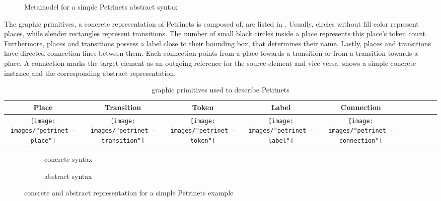 \begin{figure}[H]
  \centering
  
  \caption{Metamodel for a simple Petrinets abstract syntax}
  \label{fig:petrinets_metamodel}
\end{figure}

The graphic primitives, a concrete representation of Petrinets is composed of, are listed in . Usually, circles without fill color represent places, while slender rectangles represent transitions. The number of small black circles inside a place represents this place's token count. Furthermore, places and transitions possess a label close to their bounding box, that determines their name. Lastly, places and transitions have directed connection lines between them. Each connection points from a place towards a transition or from a transition towards a place. A connection marks the target element as an outgoing reference for the source element and vice versa.  shows a simple concrete instance and the corresponding abstract representation.



\begin{table}[ht]
  \centering
\begin{tabular}[width=.1\linewidth]{| Sc | Sc | Sc | Sc | Sc |}
  \hline
  Place & Transition & Token & Label & Connection 
  \\
  \hline
  \texttt{[image: images/"petrinet - place"]} 
  & 
  \texttt{[image: images/"petrinet - transition"]} 
  & 
  \texttt{[image: images/"petrinet - token"]}
  & 
  \texttt{[image: images/"petrinet - label"]}
  & 
  \texttt{[image: images/"petrinet - connection"]} 
  \\
  \hline
\end{tabular}
\caption{graphic primitives used to describe Petrinets}
\label{tab:petri-primitives}
\end{table}

\begin{figure}[ht!]
  \centering
  \begin{subfigure}[t]{.35\textwidth}
    \centering
    
    \caption{concrete syntax}
    \label{subfig:petriconcrete}    
  \end{subfigure}
  \begin{subfigure}[t]{.4\textwidth}
    \centering
    
    \caption{abstract syntax}
    \label{subfig:petriabstract}    
  \end{subfigure}
  \caption{concrete and abstract representation for a simple Petrinets example}
  \label{fig:petrinets_example}
\end{figure} 

